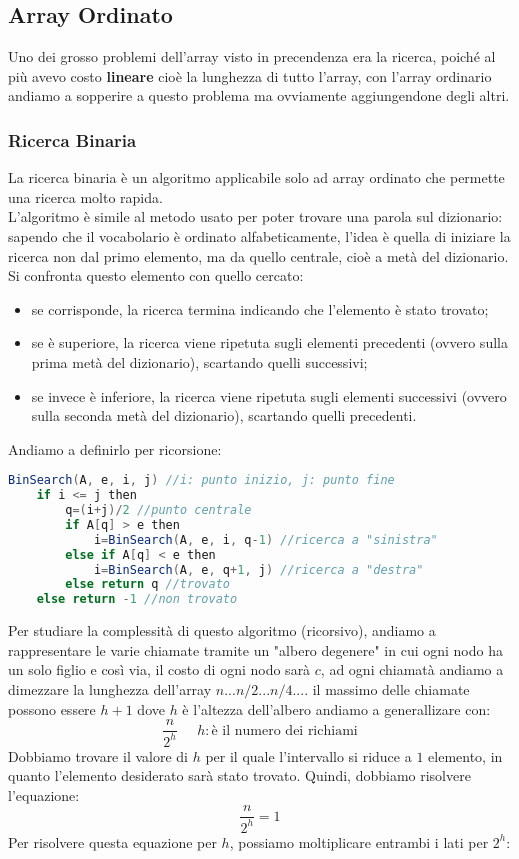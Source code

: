 \subsection{Array Ordinato}
Uno dei grosso problemi dell'array visto in precendenza era la ricerca, poiché al più avevo costo \textbf{lineare} cioè la lunghezza di tutto l'array, con l'array ordinario andiamo a sopperire a questo problema ma ovviamente aggiungendone degli altri.

\subsubsection{Ricerca Binaria}
La ricerca binaria è un algoritmo applicabile solo ad array ordinato che permette una ricerca molto rapida.\\
L'algoritmo è simile al metodo usato per poter trovare una parola sul dizionario: sapendo che il vocabolario è ordinato alfabeticamente, l'idea è quella di iniziare la ricerca non dal primo elemento, ma da quello centrale, cioè a metà del dizionario. Si confronta questo elemento con quello cercato:
\begin{itemize}
\item se corrisponde, la ricerca termina indicando che l'elemento è stato trovato;
    \item se è superiore, la ricerca viene ripetuta sugli elementi precedenti (ovvero sulla prima metà del dizionario), scartando quelli successivi;
    \item se invece è inferiore, la ricerca viene ripetuta sugli elementi successivi (ovvero sulla seconda metà del dizionario), scartando quelli precedenti.
\end{itemize}
Andiamo a definirlo per ricorsione:
\begin{lstlisting}[language=Java]
BinSearch(A, e, i, j) //i: punto inizio, j: punto fine
	if i <= j then
		q=(i+j)/2 //punto centrale
		if A[q] > e then
			i=BinSearch(A, e, i, q-1) //ricerca a "sinistra"
		else if A[q] < e then
			i=BinSearch(A, e, q+1, j) //ricerca a "destra"
		else return q //trovato
	else return -1 //non trovato
\end{lstlisting}
Per studiare la complessità di questo algoritmo (ricorsivo), andiamo a rappresentare le varie chiamate tramite un "albero degenere" in cui ogni nodo ha un solo figlio e così via, il costo di ogni nodo sarà $c$, ad ogni chiamatà andiamo a dimezzare la lunghezza dell'array $n... n/2... n/4....$ il massimo delle chiamate possono essere $h+1$ dove $h$ è l'altezza dell'albero andiamo a generallizare con:
$$ \frac{n}{2^h} \;\;\;\;\; h: \text{è il numero dei richiami} $$
Dobbiamo trovare il valore di $h$ per il quale l'intervallo si riduce a $1$ elemento, in quanto l'elemento desiderato sarà stato trovato. Quindi, dobbiamo risolvere l'equazione:
$$ \frac{n}{2^h} = 1$$
Per risolvere questa equazione per $h$, possiamo moltiplicare entrambi i lati per $2^h$:

